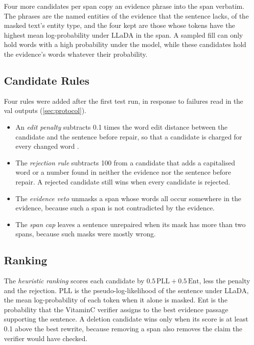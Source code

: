 \documentclass[]{paper}
\begin{document}
Four more candidates per span copy an evidence phrase into the span verbatim. The phrases are the named entities of the evidence that the sentence lacks, of the masked text's entity type, and the four kept are those whose tokens have the highest mean log-probability under LLaDA in the span. A sampled fill can only hold words with a high probability under the model, while these candidates hold the evidence's words whatever their probability.

\subsection{Candidate Rules}

Four rules were added after the first test run, in response to failures read in the val outputs (\cref{sec:protocol}).
\begin{itemize}
\item An \emph{edit penalty} subtracts 0.1 times the word edit distance between the candidate and the sentence before repair, so that a candidate is charged for every changed word \citep{chen-etal-2022-converge}.
\item The \emph{rejection rule} subtracts 100 from a candidate that adds a capitalised word or a number found in neither the evidence nor the sentence before repair. A rejected candidate still wins when every candidate is rejected.
\item The \emph{evidence veto} unmasks a span whose words all occur somewhere in the evidence, because such a span is not contradicted by the evidence.
\item The \emph{span cap} leaves a sentence unrepaired when its mask has more than two spans, because such masks were mostly wrong.
\end{itemize}

\subsection{Ranking}

The \emph{heuristic ranking} scores each candidate by $0.5\,\mathrm{PLL} + 0.5\,\mathrm{Ent}$, less the penalty and the rejection. PLL is the pseudo-log-likelihood of the sentence under LLaDA, the mean log-probability of each token when it alone is masked. Ent is the probability that the VitaminC verifier \citep{schuster-etal-2021-vitaminc} assigns to the best evidence passage supporting the sentence. A deletion candidate wins only when its score is at least 0.1 above the best rewrite, because removing a span also removes the claim the verifier would have checked.
\end{document}
